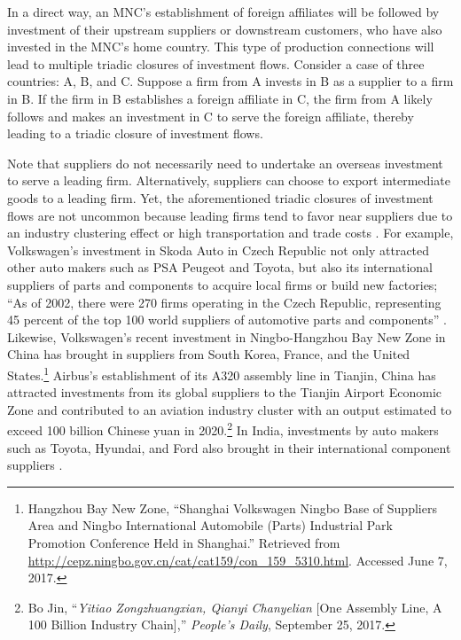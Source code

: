 \documentclass[reqno,onecolumn,letterpaper,12pt]{article}
\begin{document}
In a direct way, an MNC's establishment of foreign affiliates will be followed by investment of their upstream suppliers or downstream customers, who have also invested in the MNC's home country. This type of production connections will lead to multiple triadic closures of investment flows. Consider a case of three countries: A, B, and C. Suppose a firm from A invests in B as a supplier to a firm in B. %
If the firm in B establishes a foreign affiliate in C, %
the firm from A likely follows and makes an investment in C to serve the foreign affiliate, thereby leading to a triadic closure of investment flows.

Note that suppliers do not necessarily need to undertake an overseas investment to serve a leading firm. Alternatively, suppliers can choose to export intermediate goods to a leading firm. Yet, the aforementioned triadic closures of investment flows are not uncommon because leading firms tend to favor near suppliers due to an industry clustering effect or high transportation and trade costs \citep{Carr_et_al:2001}. For example, Volkswagen's investment in Skoda Auto in Czech Republic not only attracted other auto makers such as PSA Peugeot and Toyota, but also its international suppliers of parts and components to acquire local firms or build new factories; ``As of 2002, there were 270 firms operating in the Czech Republic, representing 45 percent of the top 100 world suppliers of automotive parts and components'' \citep[352]{Kaminski_Javorcik:2005}. Likewise, Volkswagen's recent investment in Ningbo-Hangzhou Bay New Zone in China has brought in suppliers from South Korea, France, and the United States.\footnote{Hangzhou Bay New Zone, ``Shanghai Volkswagen Ningbo Base of Suppliers Area and Ningbo International Automobile (Parts) Industrial Park Promotion Conference Held in Shanghai.'' Retrieved from \url{http://cepz.ningbo.gov.cn/cat/cat159/con_159_5310.html}. Accessed June 7, 2017.} Airbus's establishment of its A320 assembly line in Tianjin, China has attracted investments from its global suppliers to the Tianjin Airport Economic Zone and contributed to an aviation industry cluster with an output estimated to exceed 100 billion Chinese yuan in 2020.\footnote{Bo Jin, ``\textit{Yitiao Zongzhuangxian, Qianyi Chanyelian} [One Assembly Line, A 100 Billion Industry Chain],'' \textit{People's Daily}, September 25, 2017.} In India, investments by auto makers such as Toyota, Hyundai, and Ford also brought in their international component suppliers \citep[23]{Moran:2014}.
\end{document}
